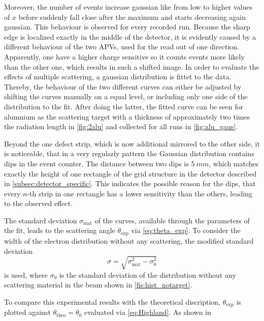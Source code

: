 \documentclass[sn-mathphys-num,iicol]{sn-jnl}
\theoremstyle{thmstyleone}
\theoremstyle{thmstyletwo}
\theoremstyle{thmstylethree}
\begin{document}
Moreover, the number of events increase gaussian like from low to higher values of $x$ before suddenly fall close after the maximum and starts decreasing again gaussian. This behaviour is observed for every recorded run. Because the sharp edge is localized exactly in the middle of the detector, it is evidently caused by a different behaviour of the two APVs, used for the read out of one direction. Apparently, one have a higher charge sensitive so it counts events more likely than the other one, which results in such a shifted image. In order to evaluate the effects of multiple scattering, a gaussian distribution is fittet to the data. Thereby, the behaviour of the two different curves can either be adjusted by shifting the curves manually on a equal level, or including only one side of the distribution to the fit. After doing the latter, the fitted curve can be seen for alumnium as the scattering target with a thickness of approximately two times the radiation length in \autoref{fig:2alu} and collected for all runs in \autoref{fig:alu_gaus}.

Beyond the one defect strip, which is now additional mirrored to the other side, it is noticeable, that in a very regularly pattern the Gaussian distribution contains dips in the event counter. The distance between two dips is $\SI{5}{mm}$, which matches exactly the height of one rectangle of the grid structure in the detector described in \autoref{subsec:detector_specific}. This indicates the possible reason for the dips, that every $n$-th strip in one rectangle has a lower sensitivity than the others, leading to the observed effect.

The standard deviation $\sigma_\text{mat}$ of the curves, available through the parameters of the fit, leads to the scattering angle $\theta_\text{exp}$ via \autoref{eq:theta_exp}. To consider the width of the electron distribution without any scattering, the modified standard deviation
\begin{equation} \label{eq:sigma_mod}
  \sigma = \sqrt{\sigma_\text{mat}^2 - \sigma_\text{0}^2}
\end{equation}
is used, where $\sigma_\text{0}$ is the standard deviation of the distribution without any scattering material in the beam shown in \autoref{fis:hist_notarget}.

To compare this experimental results with the theoretical discription, $\theta_\text{exp}$ is plotted against $\theta_\text{theo} = \theta_0$ evaluated via \autoref{eq:Highland}.
As shown in %
\end{document}
